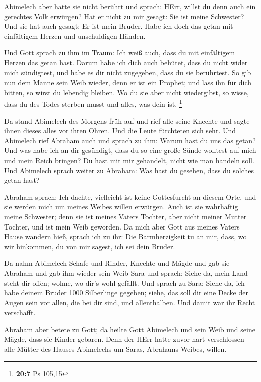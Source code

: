  Abimelech aber hatte sie nicht berührt und sprach: HErr,
willst du denn auch ein gerechtes Volk erwürgen?  Hat er
nicht zu mir gesagt: Sie ist meine Schwester? Und sie hat auch gesagt:
Er ist mein Bruder. Habe ich doch das getan mit einfältigem Herzen und
unschuldigen Händen.

 Und Gott sprach zu ihm im Traum: Ich weiß auch, dass du
mit einfältigem Herzen das getan hast. Darum habe ich dich auch behütet,
dass du nicht wider mich sündigtest, und habe es dir nicht zugegeben,
dass du sie berührtest.  So gib nun dem Manne sein Weib
wieder, denn er ist ein Prophet; und lass ihn für dich bitten, so wirst
du lebendig bleiben. Wo du sie aber nicht wiedergibst, so wisse, dass du
des Todes sterben musst und alles, was dein ist. \footnote{\textbf{20:7}
  Ps 105,15}

 Da stand Abimelech des Morgens früh auf und rief alle
seine Knechte und sagte ihnen dieses alles vor ihren Ohren. Und die
Leute fürchteten sich sehr.  Und Abimelech rief Abraham
auch und sprach zu ihm: Warum hast du uns das getan? Und was habe ich an
dir gesündigt, dass du so eine große Sünde wolltest auf mich und mein
Reich bringen? Du hast mit mir gehandelt, nicht wie man handeln soll.
 Und Abimelech sprach weiter zu Abraham: Was hast du
gesehen, dass du solches getan hast?

 Abraham sprach: Ich dachte, vielleicht ist keine
Gottesfurcht an diesem Orte, und sie werden mich um meines Weibes willen
erwürgen.  Auch ist sie wahrhaftig meine Schwester; denn
sie ist meines Vaters Tochter, aber nicht meiner Mutter Tochter, und ist
mein Weib geworden.  Da mich aber Gott aus meines Vaters
Hause wandern hieß, sprach ich zu ihr: Die Barmherzigkeit tu an mir,
dass, wo wir hinkommen, du von mir sagest, ich sei dein Bruder.

 Da nahm Abimelech Schafe und Rinder, Knechte und Mägde
und gab sie Abraham und gab ihm wieder sein Weib Sara 
und sprach: Siehe da, mein Land steht dir offen; wohne, wo dir's wohl
gefällt.  Und sprach zu Sara: Siehe da, ich habe deinem
Bruder 1000 Silberlinge gegeben; siehe, das soll dir eine Decke der
Augen sein vor allen, die bei dir sind, und allenthalben. Und damit war
ihr Recht verschafft.

 Abraham aber betete zu Gott; da heilte Gott Abimelech
und sein Weib und seine Mägde, dass sie Kinder gebaren. 
Denn der HErr hatte zuvor hart verschlossen alle Mütter des Hauses
Abimelechs um Saras, Abrahams Weibes, willen.


